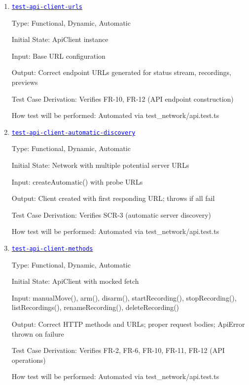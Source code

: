 \documentclass[12pt, titlepage]{article}
\newcommand{\tid}[1]{\hyperlink{tid:#1}{\textcolor{blue}{\texttt{#1}}}}
\begin{document}
\begin{enumerate}

  \item{\tid{test-api-client-urls}\\}

        Type: Functional, Dynamic, Automatic

        Initial State: ApiClient instance

        Input: Base URL configuration

        Output: Correct endpoint URLs generated for status stream, recordings, previews

        Test Case Derivation: Verifies FR-10, FR-12 (API endpoint construction)

        How test will be performed: Automated via test\_network/api.test.ts

  \item{\tid{test-api-client-automatic-discovery}\\}

        Type: Functional, Dynamic, Automatic

        Initial State: Network with multiple potential server URLs

        Input: createAutomatic() with probe URLs

        Output: Client created with first responding URL; throws if all fail

        Test Case Derivation: Verifies SCR-3 (automatic server discovery)

        How test will be performed: Automated via test\_network/api.test.ts

  \item{\tid{test-api-client-methods}\\}

        Type: Functional, Dynamic, Automatic

        Initial State: ApiClient with mocked fetch

        Input: manualMove(), arm(), disarm(), startRecording(), stopRecording(),
        listRecordings(), renameRecording(), deleteRecording()

        Output: Correct HTTP methods and URLs; proper request bodies; ApiError thrown
        on failure

        Test Case Derivation: Verifies FR-2, FR-6, FR-10, FR-11, FR-12 (API operations)

        How test will be performed: Automated via test\_network/api.test.ts

\end{enumerate}
\end{document}
